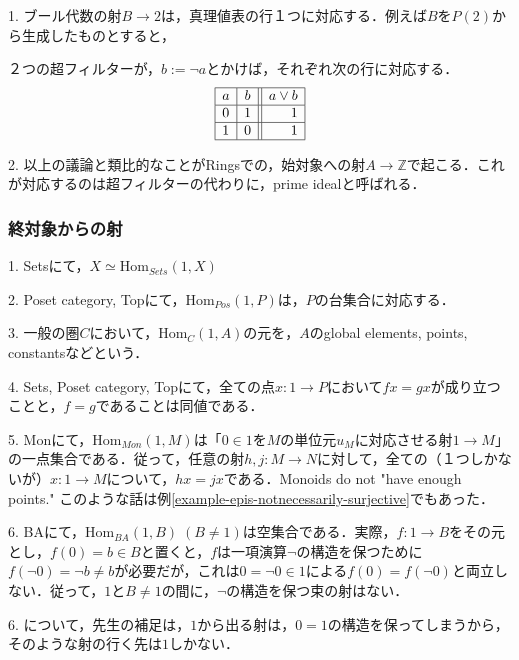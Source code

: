 \documentclass[uplatex, 12pt, dvipdfmx]{jsarticle}
\begin{document}
\begin{remark*}
    1. ブール代数の射$B\to 2$は，真理値表の行１つに対応する．例えば$B$を$P(2)$から生成したものとすると，
    \begin{center}
    \end{center}
    ２つの超フィルターが，$b:=\lnot a$とかけば，それぞれ次の行に対応する．
    \[\begin{array}{|l|c||r|}\hline
            a & b & a\lor b  \\ \hline
            0 & 1 & 1  \\\hline
            1 & 0 & 1  \\ \hline
    \end{array}\]

    2. 以上の議論と類比的なことがRingsでの，始対象への射$A\to\mathbb{Z}$で起こる．これが対応するのは超フィルターの代わりに，prime idealと呼ばれる．
\end{remark*}

\subsubsection*{終対象からの射}

\begin{example}
    1. Setsにて，$X\simeq\mathrm{Hom}_{Sets}(1,X)$

    2. Poset category, Topにて，$\mathrm{Hom}_{Pos}(1,P)$は，$P$の台集合に対応する．

    3. 一般の圏$C$において，$\mathrm{Hom}_C(1,A)$の元を，$A$のglobal elements, points, constantsなどという．

    4. Sets, Poset category, Topにて，全ての点$x:1\to P$において$fx=gx$が成り立つことと，$f=g$であることは同値である．

    5. Monにて，$\mathrm{Hom}_{Mon}(1,M)$は「$0\in 1$を$M$の単位元$u_M$に対応させる射$1\to M$」の一点集合である．従って，任意の射$h,j:M\to N$に対して，全ての（１つしかないが）$x:1\to M$について，$hx=jx$である．Monoids do not "have enough points."
    このような話は例\ref{example-epis-notnecessarily-surjective}でもあった．

    6. BAにて，$\mathrm{Hom}_{BA}(1,B)\; (B\ne 1)$は空集合である．実際，$f:1\to B$をその元とし，$f(0)=b\in B$と置くと，$f$は一項演算$\lnot$の構造を保つために$f(\lnot 0)=\lnot b\ne b$が必要だが，これは$0=\lnot 0\in 1$による$f(0)=f(\lnot 0)$と両立しない．従って，$1$と$B\ne 1$の間に，$\lnot$の構造を保つ束の射はない．
\end{example}
\begin{remark*}
    6. について，先生の補足は，$1$から出る射は，$0=1$の構造を保ってしまうから，そのような射の行く先は$1$しかない．
\end{remark*}
\end{document}
